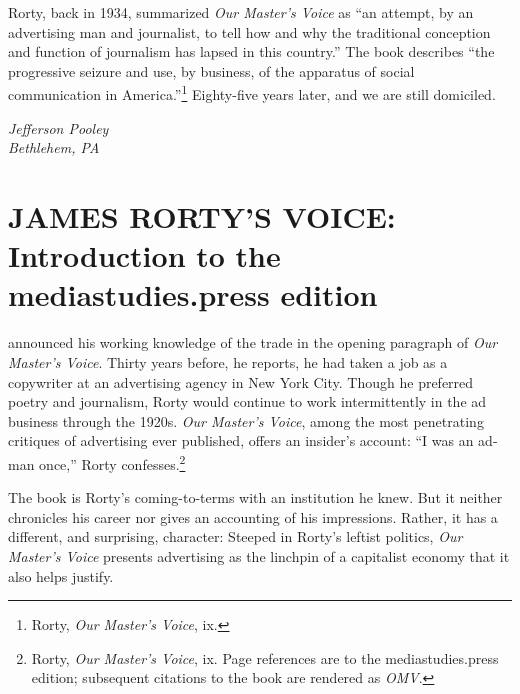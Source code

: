 \documentclass[openany,nobib]{tufte-book}
\let\oldchapter\chapter
\def\chapter{%
  \setcounter{footnote}{0}%
  \oldchapter
}
\begin{document}
Rorty, back in 1934, summarized \emph{Our Master's Voice} as ``an
attempt, by an advertising man and journalist, to tell how and why the
traditional conception and function of journalism has lapsed in this
country.'' The book describes ``the progressive seizure and use, by
business, of the apparatus of social communication in America.''\footnote{Rorty, \emph{Our Master's Voice}, ix.}
Eighty-five years later, and we are still domiciled.

\begin{flushright}\emph{Jefferson Pooley}\\ \emph{Bethlehem, PA}\end{flushright}




\chapter[JAMES RORTY'S VOICE: Introduction to the mediastudies.press edition]{JAMES RORTY'S VOICE: Introduction to the\\ mediastudies.press edition}
\label{ch:introduction-msp}

\emph{}

\vspace{0.5in}

 announced his working knowledge of the trade in the opening
paragraph of \emph{Our Master's Voice}. Thirty years before, he reports,
he had taken a job as a copywriter at an advertising agency in New York
City. Though he preferred poetry and journalism, Rorty would continue to
work intermittently in the ad business through the 1920s. \emph{Our
Master's Voice}, among the most penetrating critiques of advertising
ever published, offers an insider's account: ``I was an ad-man once,''
Rorty confesses.\footnote{Rorty, \emph{Our Master's Voice}, ix. Page references are to the
  mediastudies.press edition; subsequent citations to the book are
  rendered as \emph{OMV}.}

The book is Rorty's coming-to-terms with an institution he knew. But it
neither chronicles his career nor gives an accounting of his
impressions. Rather, it has a different, and surprising, character:
Steeped in Rorty's leftist politics, \emph{Our Master's Voice} presents
advertising as the linchpin of a capitalist economy that it also helps
justify.
\end{document}
